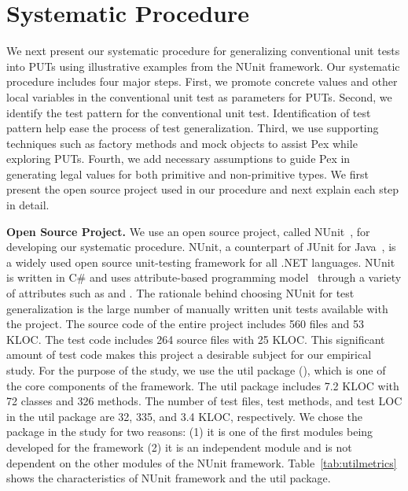 \section{Systematic Procedure}
\label{sec:procedure}

We next present our systematic procedure for generalizing conventional unit tests into PUTs using illustrative examples from the NUnit framework. Our systematic procedure includes four major steps. First, we promote concrete values and other local variables in the conventional unit test as parameters for PUTs. Second, we identify the test pattern for the conventional unit test. Identification of test pattern help ease the process of test generalization. Third, we use supporting techniques such as factory methods and mock objects to assist Pex while exploring PUTs. Fourth, we add necessary assumptions to guide Pex in generating legal values for both primitive and non-primitive types. We first present the open source project used in our procedure and next explain each step in detail.

\textbf{Open Source Project.} We use an open source project, called NUnit~\cite{nunit}, for developing our systematic procedure. NUnit, a counterpart of JUnit for Java~\cite{JUnit}, is a widely used open source unit-testing framework for all .NET languages. NUnit is written in C\# and uses attribute-based programming model~\cite{TDD} through a variety of attributes such as \CodeIn{[TestFixture]} and \CodeIn{[Test]}. The rationale behind choosing NUnit for test generalization is the large number of manually written unit tests available with the project. The source code of the entire project includes 560 files and 53 KLOC. The test code includes 264 source files with 25 KLOC. This significant amount of test code makes this project a desirable subject for our empirical study. For the purpose of the study, we use the util package (), which is one of the core components of the framework. The util package includes 7.2 KLOC with 72 classes and 326 methods. The number of test files, test methods, and test LOC in the util package are 32, 335, and 3.4 KLOC, respectively. We chose the  package in the study for two reasons: (1) it is one of the first modules being developed for the framework (2) it is an independent module and is not dependent on the other modules of the NUnit framework. Table~\ref{tab:utilmetrics} shows the characteristics of NUnit framework and the util package.

